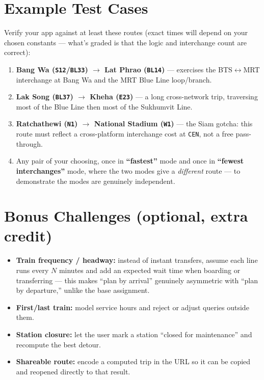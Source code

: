 \documentclass[11pt,a4paper]{article}
\begin{document}
\section{Example Test Cases}
\label{sec:tests}
Verify your app against at least these routes (exact times will depend on
your chosen constants --- what's graded is that the logic and interchange
count are correct):

\begin{enumerate}
  \item \textbf{Bang Wa (\texttt{S12}/\texttt{BL33}) $\to$ Lat Phrao
        (\texttt{BL14})} --- exercises the BTS$\leftrightarrow$MRT
        interchange at Bang Wa and the MRT Blue Line loop/branch.
  \item \textbf{Lak Song (\texttt{BL37}) $\to$ Kheha (\texttt{E23})} --- a
        long cross-network trip, traversing most of the Blue Line then
        most of the Sukhumvit Line.
  \item \textbf{Ratchathewi (\texttt{N1}) $\to$ National Stadium
        (\texttt{W1})} --- the Siam gotcha: this route must reflect a
        cross-platform interchange cost at \texttt{CEN}, not a free
        pass-through.
  \item Any pair of your choosing, once in \textbf{``fastest''} mode and
        once in \textbf{``fewest interchanges''} mode, where the two modes
        give a \emph{different} route --- to demonstrate the modes are
        genuinely independent.
\end{enumerate}

\section{Bonus Challenges (optional, extra credit)}
\label{sec:bonus}
\begin{itemize}
  \item \textbf{Train frequency / headway:} instead of instant transfers,
        assume each line runs every $N$ minutes and add an expected wait
        time when boarding or transferring --- this makes ``plan by
        arrival'' genuinely asymmetric with ``plan by departure,'' unlike
        the base assignment.
  \item \textbf{First/last train:} model service hours and reject or
        adjust queries outside them.
  \item \textbf{Station closure:} let the user mark a station ``closed for
        maintenance'' and recompute the best detour.
  \item \textbf{Shareable route:} encode a computed trip in the URL so it
        can be copied and reopened directly to that result.
\end{itemize}
\end{document}
